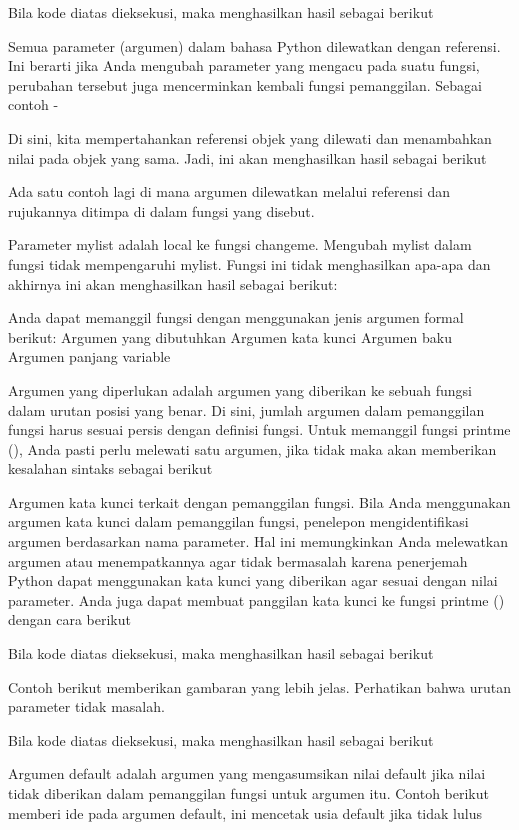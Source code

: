 Bila kode diatas dieksekusi, maka menghasilkan hasil sebagai berikut 

Semua parameter (argumen) dalam bahasa Python dilewatkan dengan referensi. Ini berarti jika Anda mengubah parameter yang mengacu pada suatu fungsi, perubahan tersebut juga mencerminkan kembali fungsi pemanggilan. Sebagai contoh - \par

Di sini, kita mempertahankan referensi objek yang dilewati dan menambahkan nilai pada objek yang sama. Jadi, ini akan menghasilkan hasil sebagai berikut 

Ada satu contoh lagi di mana argumen dilewatkan melalui referensi dan rujukannya ditimpa di dalam fungsi yang disebut. 

Parameter mylist adalah local ke fungsi changeme. Mengubah mylist dalam fungsi tidak mempengaruhi mylist. Fungsi ini tidak menghasilkan apa-apa dan akhirnya ini akan menghasilkan hasil sebagai berikut:

Anda dapat memanggil fungsi dengan menggunakan jenis argumen formal berikut: 
Argumen yang dibutuhkan 
Argumen kata kunci 
Argumen baku 
Argumen panjang variable 

Argumen yang diperlukan adalah argumen yang diberikan ke sebuah fungsi dalam urutan posisi yang benar. Di sini, jumlah argumen dalam pemanggilan fungsi harus sesuai persis dengan definisi fungsi. Untuk memanggil fungsi printme (), Anda pasti perlu melewati satu argumen, jika tidak maka akan memberikan kesalahan sintaks sebagai berikut 

Argumen kata kunci terkait dengan pemanggilan fungsi. Bila Anda menggunakan argumen kata kunci dalam pemanggilan fungsi, penelepon mengidentifikasi argumen berdasarkan nama parameter. Hal ini memungkinkan Anda melewatkan argumen atau menempatkannya agar tidak bermasalah karena penerjemah Python dapat menggunakan kata kunci yang diberikan agar sesuai dengan nilai parameter. Anda juga dapat membuat panggilan kata kunci ke fungsi printme () dengan cara berikut 

Bila kode diatas dieksekusi, maka menghasilkan hasil sebagai berikut 

Contoh berikut memberikan gambaran yang lebih jelas. Perhatikan bahwa urutan parameter tidak masalah. 

Bila kode diatas dieksekusi, maka menghasilkan hasil sebagai berikut 

Argumen default adalah argumen yang mengasumsikan nilai default jika nilai tidak diberikan dalam pemanggilan fungsi untuk argumen itu. Contoh berikut memberi ide pada argumen default, ini mencetak usia default jika tidak lulus

